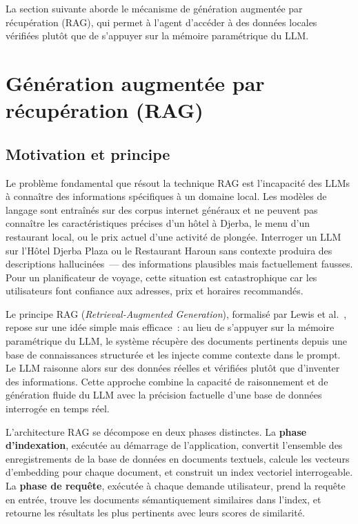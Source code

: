 La section suivante aborde le mécanisme de génération augmentée par récupération (RAG), qui
permet à l'agent d'accéder à des données locales vérifiées plutôt que de s'appuyer sur la mémoire
paramétrique du LLM.


\section{Génération augmentée par récupération (RAG)}

\subsection{Motivation et principe}

Le problème fondamental que résout la technique RAG est l'incapacité des LLMs à connaître des
informations spécifiques à un domaine local. Les modèles de langage sont entraînés sur des corpus
internet généraux et ne peuvent pas connaître les caractéristiques précises d'un hôtel à Djerba,
le menu d'un restaurant local, ou le prix actuel d'une activité de plongée. Interroger un LLM sur
\og{}l'Hôtel Djerba Plaza\fg{} ou \og{}le Restaurant Haroun\fg{} sans contexte produira des
descriptions hallucinées~--- des informations plausibles mais factuellement fausses. Pour un
planificateur de voyage, cette situation est catastrophique car les utilisateurs font confiance
aux adresses, prix et horaires recommandés.

Le principe RAG (\textit{Retrieval-Augmented Generation}), formalisé par Lewis et al.~\cite{lewis2020rag},
repose sur une idée simple mais efficace~: au lieu de s'appuyer sur la mémoire paramétrique du LLM,
le système récupère des documents pertinents depuis une base de connaissances structurée et les
injecte comme contexte dans le prompt. Le LLM raisonne alors sur des données réelles et vérifiées
plutôt que d'inventer des informations. Cette approche combine la capacité de raisonnement et de
génération fluide du LLM avec la précision factuelle d'une base de données interrogée en temps réel.

L'architecture RAG se décompose en deux phases distinctes. La \textbf{phase d'indexation}, exécutée
au démarrage de l'application, convertit l'ensemble des enregistrements de la base de données en
documents textuels, calcule les vecteurs d'embedding pour chaque document, et construit un index
vectoriel interrogeable. La \textbf{phase de requête}, exécutée à chaque demande utilisateur,
prend la requête en entrée, trouve les documents sémantiquement similaires dans l'index, et
retourne les résultats les plus pertinents avec leurs scores de similarité.


